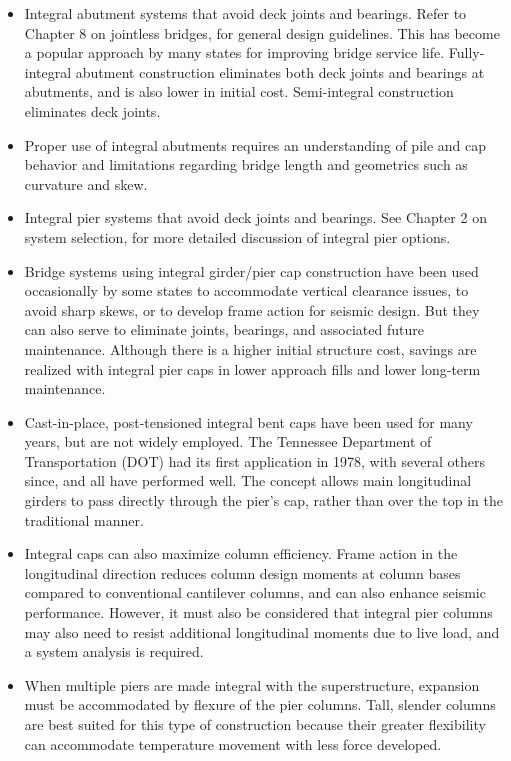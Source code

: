 \begin{itemize}
  \item Integral abutment systems that avoid deck joints and bearings. Refer to Chapter 8 on jointless bridges, for
  general design guidelines. This has become a popular approach by many states for improving bridge service
  life. Fully-integral abutment construction eliminates both deck joints and bearings at abutments, and is also
  lower in initial cost. Semi-integral construction eliminates deck joints.
  \item Proper use of integral abutments requires an understanding of pile and cap behavior and limitations regarding
  bridge length and geometrics such as curvature and skew.
  \item Integral pier systems that avoid deck joints and bearings. See Chapter 2 on system selection, for more
  detailed discussion of integral pier options.
  \item Bridge systems using integral girder/pier cap construction have been used occasionally by some states to
  accommodate vertical clearance issues, to avoid sharp skews, or to develop frame action for seismic design.
  But they can also serve to eliminate joints, bearings, and associated future maintenance. Although there is a
  higher initial structure cost, savings are realized with integral pier caps in lower approach fills and lower
  long-term maintenance.
  \item Cast-in-place, post-tensioned integral bent caps have been used for many years, but are not widely employed.
  The Tennessee Department of Transportation (DOT) had its first application in 1978, with several others
  since, and all have performed well. The concept allows main longitudinal girders to pass directly through the
  pier’s cap, rather than over the top in the traditional manner.
  \item Integral caps can also maximize column efficiency. Frame action in the longitudinal direction reduces
  column design moments at column bases compared to conventional cantilever columns, and can also enhance seismic performance. However, it must also be considered that integral pier columns may also need to resist
  additional longitudinal moments due to live load, and a system analysis is required.
  \item When multiple piers are made integral with the superstructure, expansion must be accommodated by flexure
  of the pier columns. Tall, slender columns are best suited for this type of construction because their greater
  flexibility can accommodate temperature movement with less force developed.

\end{itemize}
